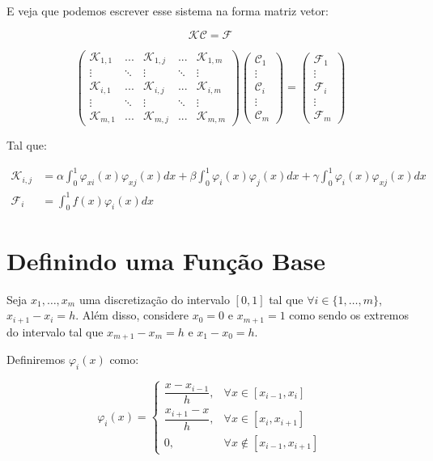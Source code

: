 E veja que podemos escrever esse sistema na forma matriz vetor:

\[\mathcal{K}\mathcal{C} = \mathcal{F}\]

\[
\begin{pmatrix}
  \mathcal{K}_{1,1} & ... & \mathcal{K}_{1,j} & ... & \mathcal{K}_{1,m} \\
  \vdots & \ddots & \vdots & \ddots & \vdots \\
  \mathcal{K}_{i,1} & ... & \mathcal{K}_{i,j} & ... & \mathcal{K}_{i,m} \\
  \vdots & \ddots & \vdots & \ddots & \vdots \\
  \mathcal{K}_{m,1} & ... & \mathcal{K}_{m,j} & ... & \mathcal{K}_{m,m}
\end{pmatrix}
\begin{pmatrix}
  \mathcal{C}_1 \\ \vdots \\ \mathcal{C}_i \\ \vdots \\ \mathcal{C}_m
\end{pmatrix}
=
\begin{pmatrix}
  \mathcal{F}_1 \\ \vdots \\ \mathcal{F}_i \\ \vdots \\ \mathcal{F}_m
\end{pmatrix}
\]

Tal que:

\begin{align*}
  \mathcal{K}_{i,j} &= \alpha \int_{0}^{1} \varphi_{xi}(x) \varphi_{xj}(x)dx + \beta \int_{0}^{1} \varphi_i(x) \varphi_j(x)dx + \gamma \int_{0}^{1} \varphi_i(x) \varphi_{xj}(x)dx \\
  \mathcal{F}_i &= \int_{0}^{1} f(x) \varphi_i(x) dx
\end{align*}

\section{Definindo uma Função Base}

Seja $x_1, \dots, x_m$ uma discretização do intervalo $[0, 1]$ tal que $\forall i \in \{1, \dots, m\}$, $x_{i+1} - x_{i} = h$. Além disso, considere $x_0 = 0$ e $x_{m+1} = 1$ como sendo os extremos do intervalo tal que $x_{m+1} - x_m = h$ e $x_1 - x_0 = h$.

Definiremos $\varphi_i(x)$ como:

\[\varphi_i(x) = \begin{cases}
  \dfrac{x - x_{i-1}}{h}, &\forall x \in [x_{i-1}, x_i] \\
  \dfrac{x_{i+1} - x}{h}, &\forall x \in [x_{i}, x_{i+1}] \\
  0 , &\forall x \notin [x_{i-1}, x_{i+1}]
\end{cases}\]

